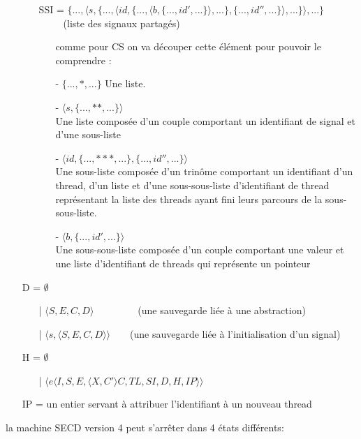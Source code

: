 \documentclass[10pt,a4paper]{article}
\begin{document}
\begin{itemize}
\begin{itemize}
\begin{itemize}
					\end{itemize}
					\item[]
					\item[] SSI =  $\{...,\langle s,\{...,\langle id,\{...,\langle b,\{...,id',...\}\rangle,...\},\{...,id'',...\}\rangle,...\}\rangle,...\}$~~~~~(liste des signaux partagés)
					\begin{itemize}
						\item[] comme pour CS on va découper cette élément pour pouvoir le comprendre :
						\item[] - $\{...,*,...\}$ Une liste. 
						\item[] - $\langle s,\{...,**,...\}\rangle$\\
						Une liste composée d'un couple comportant un identifiant de signal et d'une sous-liste
						\item[] - $\langle id,\{...,***,...\},\{...,id'',...\}\rangle$\\
						Une sous-liste composée d'un trinôme comportant un identifiant d'un thread, d'un liste et d'une sous-sous-liste d'identifiant de thread représentant la liste des threads ayant fini leurs parcours de la sous-sous-liste.
						\item[] - $\langle b,\{...,id',...\}\rangle$\\
						Une sous-sous-liste composée d'un couple comportant une valeur et une liste d'identifiant de threads qui représente un pointeur
					\end{itemize}
				\end{itemize}
				\item[] D = $\emptyset$
				\begin{itemize}
					\item[|] $\langle S,E,C,D\rangle$~~~~~~~~~(une sauvegarde liée à une abstraction)
					\item[|] $\langle s,\langle S,E,C,D\rangle\rangle$~~~~(une sauvegarde liée à l'initialisation d'un signal)
				\end{itemize}
				\item[] H = $\emptyset$ 
				\begin{itemize}
					\item[|] $\langle e\langle I,S,E,\langle X,C' \rangle C,TL,SI,D,H,IP\rangle\rangle$
				\end{itemize} 
				\item[] IP = un entier servant à attribuer l'identifiant à un nouveau thread 
			\end{itemize}
			\bigbreak
			\bigbreak
			la machine SECD version 4 peut s'arrêter dans 4 états différents:
\end{document}

